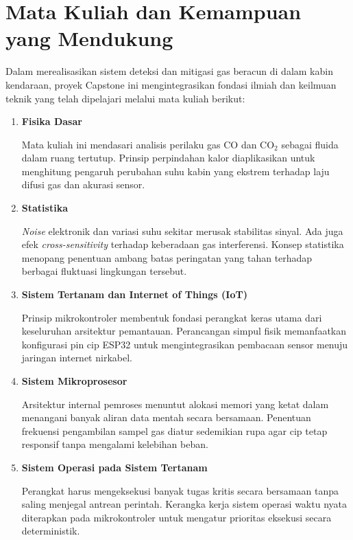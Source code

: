 \section{Mata Kuliah dan Kemampuan yang Mendukung}
\label{sec:Mata_Kuliah_dan_Kemampuan_yang_Mendukung}

Dalam merealisasikan sistem deteksi dan mitigasi gas beracun di dalam kabin kendaraan, proyek Capstone ini mengintegrasikan fondasi ilmiah dan keilmuan teknik yang telah dipelajari melalui mata kuliah berikut:

\begin{enumerate}[label=\alph*.]

    \item \textbf{Fisika Dasar}

    Mata kuliah ini mendasari analisis perilaku gas CO dan CO$_2$ sebagai fluida dalam ruang tertutup. Prinsip perpindahan kalor diaplikasikan untuk menghitung pengaruh perubahan suhu kabin yang ekstrem terhadap laju difusi gas dan akurasi sensor.

    \item \textbf{Statistika}

    \textit{Noise} elektronik dan variasi suhu sekitar merusak stabilitas sinyal. Ada juga efek \textit{cross-sensitivity} terhadap keberadaan gas interferensi. Konsep statistika menopang penentuan ambang batas peringatan yang tahan terhadap berbagai fluktuasi lingkungan tersebut.

    \item \textbf{Sistem Tertanam dan Internet of Things (IoT)}

    Prinsip mikrokontroler membentuk fondasi perangkat keras utama dari keseluruhan arsitektur pemantauan. Perancangan simpul fisik memanfaatkan konfigurasi pin cip ESP32 untuk mengintegrasikan pembacaan sensor menuju jaringan internet nirkabel.

    \item \textbf{Sistem Mikroprosesor}

    Arsitektur internal pemroses menuntut alokasi memori yang ketat dalam menangani banyak aliran data mentah secara bersamaan. Penentuan frekuensi pengambilan sampel gas diatur sedemikian rupa agar cip tetap responsif tanpa mengalami kelebihan beban.

    \item \textbf{Sistem Operasi pada Sistem Tertanam}

    Perangkat harus mengeksekusi banyak tugas kritis secara bersamaan tanpa saling menjegal antrean perintah. Kerangka kerja sistem operasi waktu nyata diterapkan pada mikrokontroler untuk mengatur prioritas eksekusi secara deterministik.


\end{enumerate}
